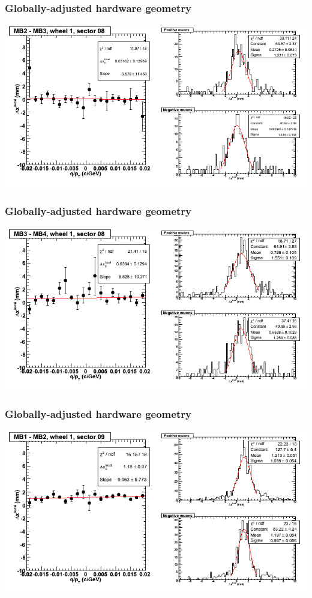 \documentclass[compress]{beamer}
\begin{document}
\begin{frame}
\frametitle{Globally-adjusted hardware geometry}
\includegraphics[width=\linewidth]{NOV4_segdiffs_HW/dt13_resid_D_08_23.png}
\end{frame}

\begin{frame}
\frametitle{Globally-adjusted hardware geometry}
\includegraphics[width=\linewidth]{NOV4_segdiffs_HW/dt13_resid_D_08_34.png}
\end{frame}

\begin{frame}
\frametitle{Globally-adjusted hardware geometry}
\includegraphics[width=\linewidth]{NOV4_segdiffs_HW/dt13_resid_D_09_12.png}
\end{frame}
\end{document}
